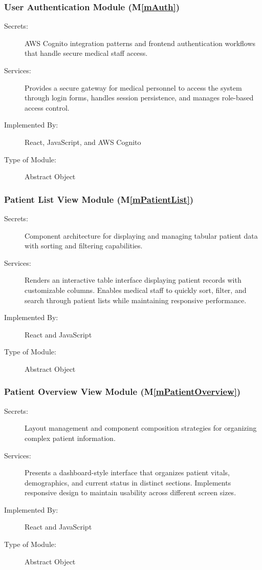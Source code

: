 \documentclass[12pt, titlepage]{article}
\newcommand{\mref}[1]{M\ref{#1}}
\begin{document}
\subsubsection{User Authentication Module (\mref{mAuth})}
\begin{description}
\item[Secrets:] AWS Cognito integration patterns and frontend authentication workflows that handle secure medical staff access.
\item[Services:] Provides a secure gateway for medical personnel to access the system through login forms, handles session persistence, and manages role-based access control.
\item[Implemented By:] React, JavaScript, and AWS Cognito
\item[Type of Module:] Abstract Object
\end{description}

\subsubsection{Patient List View Module (\mref{mPatientList})}
\begin{description}
\item[Secrets:] Component architecture for displaying and managing tabular patient data with sorting and filtering capabilities.
\item[Services:] Renders an interactive table interface displaying patient records with customizable columns. Enables medical staff to quickly sort, filter, and search through patient lists while maintaining responsive performance.
\item[Implemented By:] React and JavaScript
\item[Type of Module:] Abstract Object
\end{description}

\subsubsection{Patient Overview View Module (\mref{mPatientOverview})}
\begin{description}
\item[Secrets:] Layout management and component composition strategies for organizing complex patient information.
\item[Services:] Presents a dashboard-style interface that organizes patient vitals, demographics, and current status in distinct sections. Implements responsive design to maintain usability across different screen sizes.
\item[Implemented By:] React and JavaScript
\item[Type of Module:] Abstract Object
\end{description}
\end{document}
